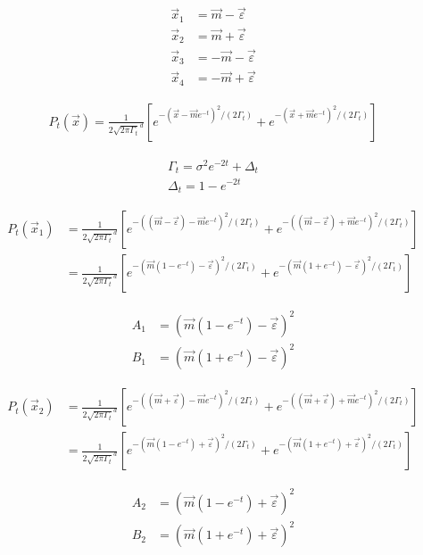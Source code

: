 \documentclass[11pt,a4paper]{article}
\begin{document}
\begin{align}
\vec{x}_1 &= \vec{m} - \vec{\varepsilon} \\
\vec{x}_2 &= \vec{m} + \vec{\varepsilon} \\
\vec{x}_3 &= -\vec{m} - \vec{\varepsilon} \\
\vec{x}_4 &= -\vec{m} + \vec{\varepsilon}
\end{align}

\begin{align}
P_t(\vec{x}) = \frac{1}{2\sqrt{2\pi\Gamma_t}^d}\left[
e^{-(\vec{x}-\vec{m} e^{-t})^2/(2 \Gamma_t)}
+e^{-(\vec{x}+\vec{m} e^{-t})^2/(2 \Gamma_t)}
\right]
\end{align}

\begin{align}
\Gamma_t=\sigma^2 e^{-2t} + \Delta_t \\
\Delta_t = 1-e^{-2t}
\end{align}

\begin{align}
P_t(\vec{x}_1) &= \frac{1}{2\sqrt{2\pi\Gamma_t}^d}\left[
e^{-((\vec{m}-\vec{\varepsilon})-\vec{m} e^{-t})^2/(2 \Gamma_t)}
+e^{-((\vec{m}-\vec{\varepsilon})+\vec{m} e^{-t})^2/(2 \Gamma_t)}
\right] \\
&= \frac{1}{2\sqrt{2\pi\Gamma_t}^d}\left[
e^{-(\vec{m}(1-e^{-t})-\vec{\varepsilon})^2/(2 \Gamma_t)}
+e^{-(\vec{m}(1+e^{-t})-\vec{\varepsilon})^2/(2 \Gamma_t)}
\right]
\end{align}

\begin{align}
A_1 &= (\vec{m}(1-e^{-t})-\vec{\varepsilon})^2 \\
B_1 &= (\vec{m}(1+e^{-t})-\vec{\varepsilon})^2
\end{align}

\begin{align}
P_t(\vec{x}_2) &= \frac{1}{2\sqrt{2\pi\Gamma_t}^d}\left[
e^{-((\vec{m}+\vec{\varepsilon})-\vec{m} e^{-t})^2/(2 \Gamma_t)}
+e^{-((\vec{m}+\vec{\varepsilon})+\vec{m} e^{-t})^2/(2 \Gamma_t)}
\right] \\
&= \frac{1}{2\sqrt{2\pi\Gamma_t}^d}\left[
e^{-(\vec{m}(1-e^{-t})+\vec{\varepsilon})^2/(2 \Gamma_t)}
+e^{-(\vec{m}(1+e^{-t})+\vec{\varepsilon})^2/(2 \Gamma_t)}
\right]
\end{align}

\begin{align}
A_2 &= (\vec{m}(1-e^{-t})+\vec{\varepsilon})^2 \\
B_2 &= (\vec{m}(1+e^{-t})+\vec{\varepsilon})^2
\end{align}
\end{document}
